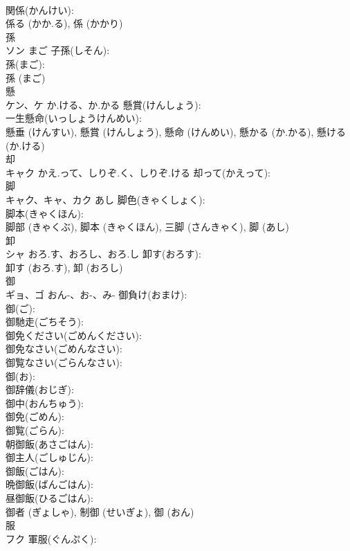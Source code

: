 \documentclass[8pt]{extreport}
\begin{document}
\begin{CJK}{UTF8}{min}
\\	関係(かんけい): 
\\	係る (かか.る), 係 (かかり)
\\	孫			
\\	ソン	まご	子孫(しそん): 
\\	孫(まご): 
\\	孫 (まご)
\\	懸			
\\	ケン、ケ	か.ける、か.かる	懸賞(けんしょう): 
\\	一生懸命(いっしょうけんめい): 
\\	懸垂 (けんすい), 懸賞 (けんしょう), 懸命 (けんめい), 懸かる (か.かる), 懸ける (か.ける)
\\	却			
\\	キャク	かえ.って、しりぞ.く、しりぞ.ける	却って(かえって): 
\\	脚			
\\	キャク、キャ、カク	あし	脚色(きゃくしょく): 
\\	脚本(きゃくほん): 
\\	脚部 (きゃくぶ), 脚本 (きゃくほん), 三脚 (さんきゃく), 脚 (あし)
\\	卸			
\\	シャ	おろ.す、おろし、おろ.し	卸す(おろす): 
\\	卸す (おろ.す), 卸 (おろし)
\\	御			
\\	ギョ、ゴ	おん-、お-、み-	御負け(おまけ): 
\\	御(ご): 
\\	御馳走(ごちそう): 
\\	御免ください(ごめんください): 
\\	御免なさい(ごめんなさい): 
\\	御覧なさい(ごらんなさい): 
\\	御(お): 
\\	御辞儀(おじぎ): 
\\	御中(おんちゅう): 
\\	御免(ごめん): 
\\	御覧(ごらん): 
\\	朝御飯(あさごはん): 
\\	御主人(ごしゅじん): 
\\	御飯(ごはん): 
\\	晩御飯(ばんごはん): 
\\	昼御飯(ひるごはん): 
\\	御者 (ぎょしゃ), 制御 (せいぎょ), 御 (おん)
\\	服			
\\	フク		軍服(ぐんぷく): 

\end{CJK}
\end{document}
